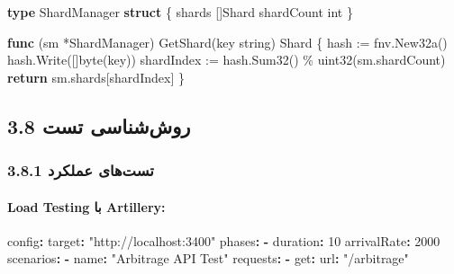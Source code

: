 \documentclass[
]{article}
\newenvironment{Shaded}{}{}
\newcommand{\AttributeTok}[1]{\textcolor[rgb]{0.49,0.56,0.16}{#1}}
\newcommand{\ControlFlowTok}[1]{\textcolor[rgb]{0.00,0.44,0.13}{\textbf{#1}}}
\newcommand{\DataTypeTok}[1]{\textcolor[rgb]{0.56,0.13,0.00}{#1}}
\newcommand{\DecValTok}[1]{\textcolor[rgb]{0.25,0.63,0.44}{#1}}
\newcommand{\FunctionTok}[1]{\textcolor[rgb]{0.02,0.16,0.49}{#1}}
\newcommand{\KeywordTok}[1]{\textcolor[rgb]{0.00,0.44,0.13}{\textbf{#1}}}
\newcommand{\NormalTok}[1]{#1}
\newcommand{\OperatorTok}[1]{\textcolor[rgb]{0.40,0.40,0.40}{#1}}
\newcommand{\StringTok}[1]{\textcolor[rgb]{0.25,0.44,0.63}{#1}}
\begin{document}
\begin{Shaded}
\begin{Highlighting}[]
\KeywordTok{type}\NormalTok{ ShardManager }\KeywordTok{struct} \OperatorTok{\{}
\NormalTok{    shards }\OperatorTok{[]}\NormalTok{Shard}
\NormalTok{    shardCount }\DataTypeTok{int}
\OperatorTok{\}}

\KeywordTok{func} \OperatorTok{(}\NormalTok{sm }\OperatorTok{*}\NormalTok{ShardManager}\OperatorTok{)}\NormalTok{ GetShard}\OperatorTok{(}\NormalTok{key }\DataTypeTok{string}\OperatorTok{)}\NormalTok{ Shard }\OperatorTok{\{}
\NormalTok{    hash }\OperatorTok{:=}\NormalTok{ fnv}\OperatorTok{.}\NormalTok{New32a}\OperatorTok{()}
\NormalTok{    hash}\OperatorTok{.}\NormalTok{Write}\OperatorTok{([]}\DataTypeTok{byte}\OperatorTok{(}\NormalTok{key}\OperatorTok{))}
\NormalTok{    shardIndex }\OperatorTok{:=}\NormalTok{ hash}\OperatorTok{.}\NormalTok{Sum32}\OperatorTok{()} \OperatorTok{\%} \DataTypeTok{uint32}\OperatorTok{(}\NormalTok{sm}\OperatorTok{.}\NormalTok{shardCount}\OperatorTok{)}
    \ControlFlowTok{return}\NormalTok{ sm}\OperatorTok{.}\NormalTok{shards}\OperatorTok{[}\NormalTok{shardIndex}\OperatorTok{]}
\OperatorTok{\}}
\end{Highlighting}
\end{Shaded}

\subsection{3.8 روش‌شناسی
تست}\label{ux631ux648ux634ux634ux646ux627ux633ux6cc-ux62aux633ux62a}

\subsubsection{3.8.1 تست‌های
عملکرد}\label{ux62aux633ux62aux647ux627ux6cc-ux639ux645ux644ux6a9ux631ux62f}

\paragraph{Load Testing با
Artillery:}\label{load-testing-ux628ux627-artillery}

\begin{Shaded}
\begin{Highlighting}[]
\FunctionTok{config}\KeywordTok{:}
\AttributeTok{  }\FunctionTok{target}\KeywordTok{:}\AttributeTok{ }\StringTok{"http://localhost:3400"}
\AttributeTok{  }\FunctionTok{phases}\KeywordTok{:}
\AttributeTok{    }\KeywordTok{{-}}\AttributeTok{ }\FunctionTok{duration}\KeywordTok{:}\AttributeTok{ }\DecValTok{10}
\AttributeTok{      }\FunctionTok{arrivalRate}\KeywordTok{:}\AttributeTok{ }\DecValTok{2000}
\FunctionTok{scenarios}\KeywordTok{:}
\AttributeTok{  }\KeywordTok{{-}}\AttributeTok{ }\FunctionTok{name}\KeywordTok{:}\AttributeTok{ }\StringTok{"Arbitrage API Test"}
\AttributeTok{    }\FunctionTok{requests}\KeywordTok{:}
\AttributeTok{      }\KeywordTok{{-}}\AttributeTok{ }\FunctionTok{get}\KeywordTok{:}
\AttributeTok{          }\FunctionTok{url}\KeywordTok{:}\AttributeTok{ }\StringTok{"/arbitrage"}
\end{Highlighting}
\end{Shaded}
\end{document}
